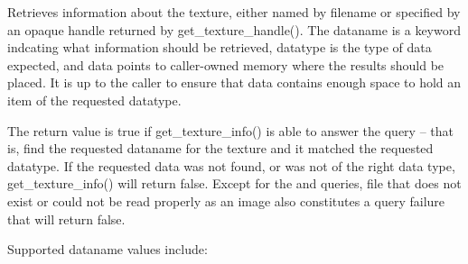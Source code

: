 
Retrieves information about the texture, either named by {\cf filename} or
specified by an opaque handle returned by {\cf get_texture_handle()}.
The {\cf dataname} is a keyword indcating what information should
be retrieved, {\cf datatype} is the type of data expected, and
{\cf data} points to caller-owned memory where the results should be
placed.  It is up to the caller to ensure that {\cf data} contains
enough space to hold an item of the requested {\cf datatype}.

The return value is {\cf true} if {\cf get_texture_info()} is able to answer
the query -- that is, find the requested {\cf dataname} for the texture and
it matched the requested {\cf datatype}.  If the requested data was not
found, or was not of the right data type, {\cf get_texture_info()} will
return {\cf false}. Except for the  and  queries, file that does not
exist or could not be read properly as an image also constitutes a query
failure that will return {\cf false}.

Supported {\cf dataname} values include:

